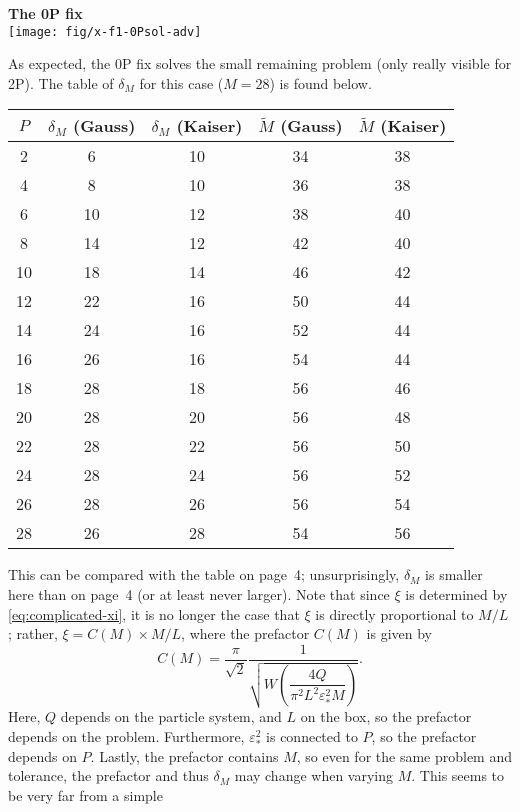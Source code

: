 \documentclass[a4paper,10pt]{article}
\begin{document}
\begin{center}
  \textbf{The 0P fix}\\
  \texttt{[image: fig/x-f1-0Psol-adv]}
\end{center}
As expected, the 0P fix solves the small remaining problem (only
really visible for 2P). The table of $\delta_M$ for this case
($M=28$) is found below.
\begin{center}
  \begin{tabular}{ccccc}
    \toprule
    $P$ & $\delta_M$ (Gauss) & $\delta_M$ (Kaiser) & $\tilde{M}$
    (Gauss) & $\tilde{M}$ (Kaiser) \\
    \midrule
     2 &  6 & 10 & 34 & 38 \\
     4 &  8 & 10 & 36 & 38 \\
     6 & 10 & 12 & 38 & 40 \\
     8 & 14 & 12 & 42 & 40 \\
    10 & 18 & 14 & 46 & 42 \\
    12 & 22 & 16 & 50 & 44 \\
    14 & 24 & 16 & 52 & 44 \\
    16 & 26 & 16 & 54 & 44 \\
    18 & 28 & 18 & 56 & 46 \\
    20 & 28 & 20 & 56 & 48 \\
    22 & 28 & 22 & 56 & 50 \\
    24 & 28 & 24 & 56 & 52 \\
    26 & 28 & 26 & 56 & 54 \\
    28 & 26 & 28 & 54 & 56 \\
    \bottomrule
  \end{tabular}
\end{center}
This can be compared with the table on page~4; unsurprisingly,
$\delta_M$ is smaller here than on page~4 (or at least never
larger). Note that since $\xi$ is determined by
\eqref{eq:complicated-xi}, it is no longer the case that $\xi$ is
directly proportional to $M/L$; rather, $\xi = C(M) \times M/L$,
where the prefactor $C(M)$ is given by
\[
  C(M) = \frac{\pi}{\sqrt{2}}
  \frac{1}{\sqrt{W\left(\dfrac{4Q}{\pi^2 L^2 \varepsilon_*^2 M}\right)}}.
\]
Here, $Q$ depends on the particle system, and $L$ on the box, so
the prefactor depends on the problem. Furthermore,
$\varepsilon_*^2$ is connected to $P$, so the prefactor depends
on $P$. Lastly, the prefactor contains $M$, so even for the same
problem and tolerance, the prefactor and thus $\delta_M$ may
change when varying $M$. This seems to be very far from a simple
\end{document}
